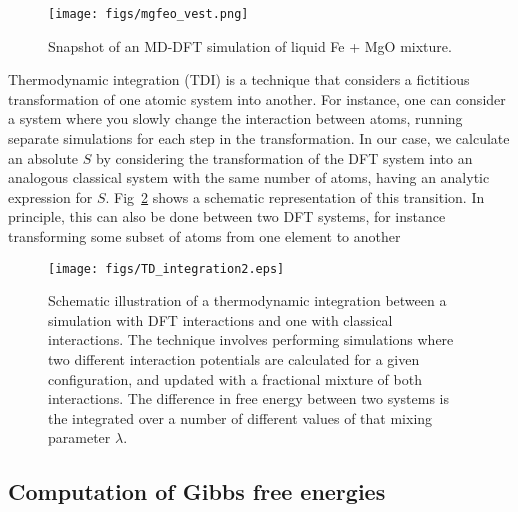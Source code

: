  \begin{figure}[h!] %
   \centering
   \texttt{[image: figs/mgfeo\_vest.png]} 
\caption{Snapshot of an MD-DFT simulation of liquid Fe + MgO
    mixture.\label{femgosnap}}
\end{figure}

Thermodynamic integration (TDI) is a technique that considers a fictitious
transformation of one atomic system into another. For instance, one can consider a
system where you slowly change the interaction between atoms, running separate
simulations for each step in the transformation. In our case, we calculate an absolute
$S$ by considering the transformation of the DFT system into an
analogous classical system with the same number of atoms, having an analytic
expression for $S$. Fig~\ref{tdi} shows a schematic representation of this
transition. In principle, this can also be done between two DFT systems, for
instance transforming some subset of atoms from one element to another 

 \begin{figure}[h!] %
   \centering
   \texttt{[image: figs/TD\_integration2.eps]} 
\caption{Schematic illustration of a thermodynamic integration between a simulation 
    with DFT interactions and one with classical interactions. The technique involves
    performing simulations where two different interaction potentials are calculated
    for a given configuration, and updated with a fractional mixture of both
    interactions. The difference in free energy between two systems is the integrated 
    over a number of different values of that mixing parameter $\lambda$.\label{tdi}}
\end{figure}

\subsection{Computation of Gibbs free energies}


